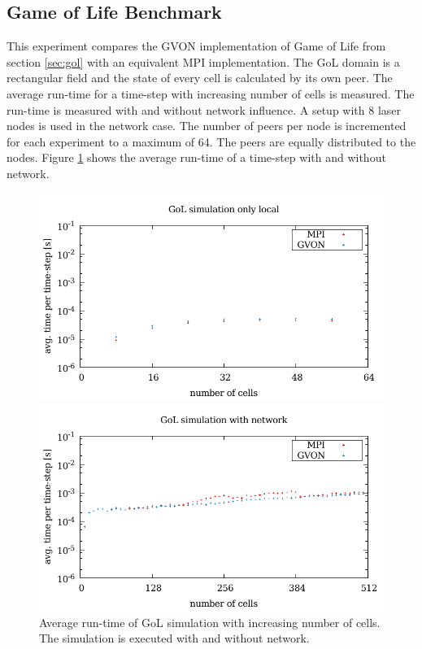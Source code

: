 \subsection{Game of Life Benchmark}
This experiment compares the GVON implementation of Game of Life from
section \ref{sec:gol} with an equivalent MPI implementation. The GoL
domain is a rectangular field and the state of every cell is
calculated by its own peer. The average run-time for a time-step with
increasing number of cells is measured. The run-time is measured with
and without network influence. A setup with 8 laser nodes is used in
the network case. The number of peers per node is incremented for each
experiment to a maximum of 64. The peers are equally distributed to
the nodes.  Figure \ref{fig:gol_laser} shows the average run-time of a
time-step with and without network.

\begin{figure}[H]
  \begin{minipage}[t]{0.5\textwidth}
    \includegraphics[width=\textwidth]{plots/50_gol_ncells_laser}
  \end{minipage}%
  \begin{minipage}[t]{0.5\textwidth}
    \includegraphics[width=\textwidth]{plots/50_gol_network_laser}
  \end{minipage}%
  \label{fig:gol_laser}
  \caption{Average run-time of GoL simulation with increasing number
    of cells. The simulation is executed with and without network.}
\end{figure}

